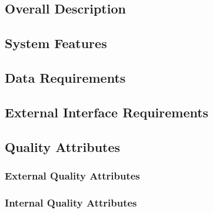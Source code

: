     \subsection{Overall Description}
        

    \subsection{System Features}
        

    \subsection{Data Requirements}
    

    \subsection{External Interface Requirements}
        

    \subsection{Quality Attributes}
        \subsubsection{External Quality Attributes}
        \subsubsection{Internal Quality Attributes}






